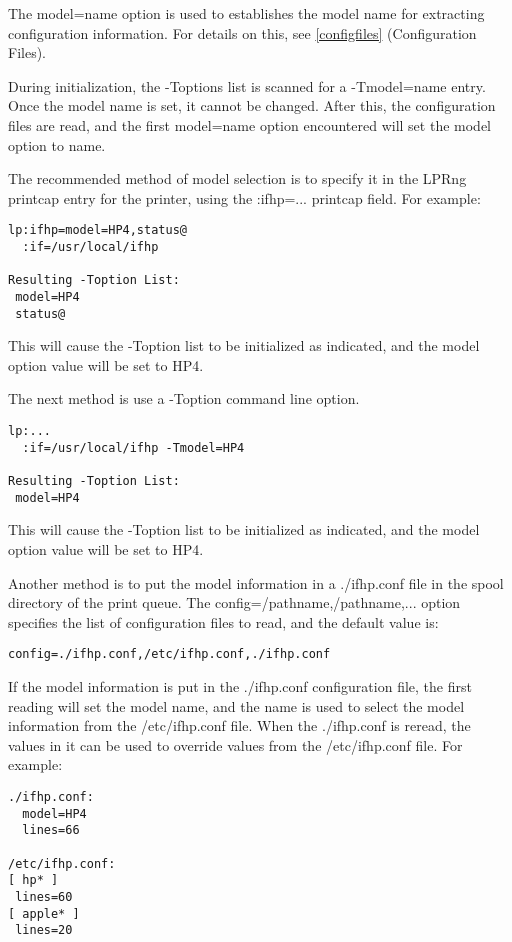 \documentclass[a4paper]{article}
\begin{document}
The
{\ttfamily model=name}
option is used to establishes the model name for extracting
configuration information.
For details on this, see
\ref{configfiles} {(Configuration Files)}.

During initialization,
the
{\ttfamily -Toptions}
list is scanned for a
{\ttfamily -Tmodel=name}
entry.
Once the model name is set, it cannot be changed.
After this,
the configuration files are read,
and the first
{\ttfamily model=name}
option encountered will set the
{\ttfamily model}
option to
{\ttfamily name}.

The recommended method of model selection is to
specify it in the
LPRng printcap entry for the printer,
using the {\ttfamily :ifhp=...}
printcap field.
For example:
\begin{tscreen}
\begin{verbatim}
lp:ifhp=model=HP4,status@
  :if=/usr/local/ifhp

Resulting -Toption List:
 model=HP4
 status@
\end{verbatim}
\end{tscreen}


This will cause the
{\ttfamily -Toption}
list to be initialized as indicated,
and the
{\ttfamily model}
option value will be set to
{\ttfamily HP4}.

The next method is use a
{\ttfamily -Toption}
command line option.
\begin{tscreen}
\begin{verbatim}
lp:...
  :if=/usr/local/ifhp -Tmodel=HP4

Resulting -Toption List:
 model=HP4
\end{verbatim}
\end{tscreen}


This will cause the
{\ttfamily -Toption}
list to be initialized as indicated,
and the
{\ttfamily model}
option value will be set to
{\ttfamily HP4}.

Another method is to put the model information in a
{\ttfamily ./ifhp.conf}
file in the spool directory of the print queue.
The
{\ttfamily config=/pathname,/pathname,...}
option specifies the list of configuration files to read,
and the default value is:
\begin{tscreen}
\begin{verbatim}
config=./ifhp.conf,/etc/ifhp.conf,./ifhp.conf
\end{verbatim}
\end{tscreen}


If the model information is put in the 
{\ttfamily ./ifhp.conf}
configuration file,
the first reading will set the model name,
and the name is used to select the model information from the
{\ttfamily /etc/ifhp.conf}
file.
When the 
{\ttfamily ./ifhp.conf}
is reread,  the values in it can be used to override values from the
{\ttfamily /etc/ifhp.conf}
file.
For example:
\begin{tscreen}
\begin{verbatim}
./ifhp.conf:
  model=HP4
  lines=66

/etc/ifhp.conf:
[ hp* ]
 lines=60
[ apple* ]
 lines=20
\end{verbatim}
\end{tscreen}
\end{document}
